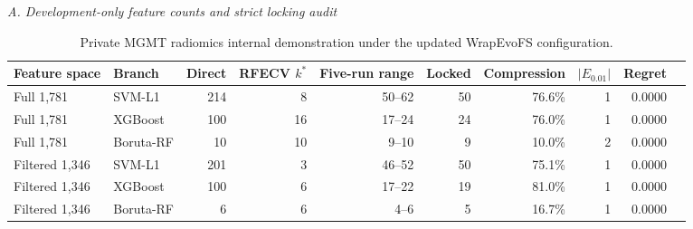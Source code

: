 \begin{table}[p]
\centering
\caption{Private MGMT radiomics internal demonstration under the updated WrapEvoFS configuration.}
\label{tab:supp21}
\scriptsize
\setlength{\tabcolsep}{3.0pt}
\renewcommand{\arraystretch}{1.08}
\textit{A. Development-only feature counts and strict locking audit}\par\smallskip
\begin{tabular}{llrrrrrrrr}
\toprule
Feature space & Branch & Direct & RFECV $k^*$ & Five-run range & Locked & Compression & $|E_{0.01}|$ & Regret \\
\midrule
Full 1,781 & SVM-L1 & 214 & 8 & 50--62 & 50 & 76.6\% & 1 & 0.0000 \\
Full 1,781 & XGBoost & 100 & 16 & 17--24 & 24 & 76.0\% & 1 & 0.0000 \\
Full 1,781 & Boruta-RF & 10 & 10 & 9--10 & 9 & 10.0\% & 2 & 0.0000 \\
Filtered 1,346 & SVM-L1 & 201 & 3 & 46--52 & 50 & 75.1\% & 1 & 0.0000 \\
Filtered 1,346 & XGBoost & 100 & 6 & 17--22 & 19 & 81.0\% & 1 & 0.0000 \\
Filtered 1,346 & Boruta-RF & 6 & 6 & 4--6 & 5 & 16.7\% & 1 & 0.0000 \\
\bottomrule
\end{tabular}


\end{table}

